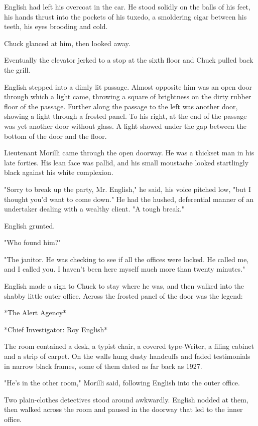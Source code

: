 \documentclass{novel}
\begin{document}
English had left his overcoat in the car. He stood solidly on the balls of his feet, his hands thrust into the pockets of his tuxedo, a smoldering cigar between his teeth, his eyes brooding and cold.

Chuck glanced at him, then looked away.

Eventually the elevator jerked to a stop at the sixth floor and Chuck pulled back the grill.

English stepped into a dimly lit passage. Almost opposite him was an open door through which a light came, throwing a square of brightness on the dirty rubber floor of the passage. Further along the passage to the left was another door, showing a light through a frosted panel. To his right, at the end of the passage was yet another door without glass. A light showed under the gap between the bottom of the door and the floor.

Lieutenant Morilli came through the open doorway. He was a thickset man in his late forties. His lean face was pallid, and his small moustache looked startlingly black against his white complexion.

"Sorry to break up the party, Mr. English," he said, his voice pitched low, "but I thought you'd want to come down." He had the hushed, deferential manner of an undertaker dealing with a wealthy client. "A tough break."

English grunted.

"Who found him?"

"The janitor. He was checking to see if all the offices were locked. He called me, and I called you. I haven't been here myself much more than twenty minutes."

English made a sign to Chuck to stay where he was, and then walked into the shabby little outer office. Across the frosted panel of the door was the legend:

*The Alert Agency*

*Chief Investigator: Roy English*

The room contained a desk, a typist chair, a covered type-Writer, a filing cabinet and a strip of carpet. On the walls hung dusty handcuffs and faded testimonials in narrow black frames, some of them dated as far back as 1927.

"He's in the other room," Morilli said, following English into the outer office.

Two plain-clothes detectives stood around awkwardly. English nodded at them, then walked across the room and paused in the doorway that led to the inner office.
\end{document}
